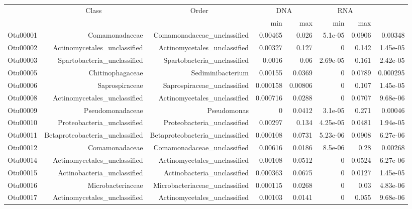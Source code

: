 \begin{table}[ht]
\centering
\begin{tabular}{crrrrrrr}
  \hline
  & \multicolumn{1}{c}{Class} & \multicolumn{1}{c}{Order} & 
                      \multicolumn{2}{c}{DNA} & \multicolumn{2}{c}{RNA} \\
 & &  & min & max & min & max \\
 \hline
Otu00001 & Comamonadaceae & Comamonadaceae\_unclassified & 0.00465 & 0.026 & 5.1e-05 & 0.0906 & 0.00348 \\ 
  Otu00002 & Actinomycetales\_unclassified & Actinomycetales\_unclassified & 0.00327 & 0.127 & 0 & 0.142 & 1.45e-05 \\ 
  Otu00003 & Spartobacteria\_unclassified & Spartobacteria\_unclassified & 0.0016 & 0.06 & 2.69e-05 & 0.161 & 2.42e-05 \\ 
  Otu00005 & Chitinophagaceae & Sediminibacterium & 0.00155 & 0.0369 & 0 & 0.0789 & 0.000295 \\ 
  Otu00006 & Saprospiraceae & Saprospiraceae\_unclassified & 0.000158 & 0.00806 & 0 & 0.107 & 1.45e-05 \\ 
  Otu00008 & Actinomycetales\_unclassified & Actinomycetales\_unclassified & 0.000716 & 0.0288 & 0 & 0.0707 & 9.68e-06 \\ 
  Otu00009 & Pseudomonadaceae & Pseudomonas & 0 & 0.0412 & 3.1e-05 & 0.271 & 0.00046 \\ 
  Otu00010 & Proteobacteria\_unclassified & Proteobacteria\_unclassified & 0.00297 & 0.134 & 4.25e-05 & 0.0481 & 1.94e-05 \\ 
  Otu00011 & Betaproteobacteria\_unclassified & Betaproteobacteria\_unclassified & 0.000108 & 0.0731 & 5.23e-06 & 0.0908 & 6.27e-06 \\ 
  Otu00012 & Comamonadaceae & Comamonadaceae\_unclassified & 0.00616 & 0.0186 & 8.5e-06 & 0.28 & 0.00268 \\ 
  Otu00014 & Actinomycetales\_unclassified & Actinomycetales\_unclassified & 0.00108 & 0.0512 & 0 & 0.0524 & 6.27e-06 \\ 
  Otu00015 & Actinobacteria\_unclassified & Actinobacteria\_unclassified & 0.000363 & 0.0675 & 0 & 0.0127 & 1.45e-05 \\ 
  Otu00016 & Microbacteriaceae & Microbacteriaceae\_unclassified & 0.000115 & 0.0268 & 0 & 0.03 & 4.83e-06 \\ 
  Otu00017 & Actinomycetales\_unclassified & Actinomycetales\_unclassified & 0.00103 & 0.0141 & 0 & 0.055 & 9.68e-06 \\ 

\end{tabular}
\end{table}
